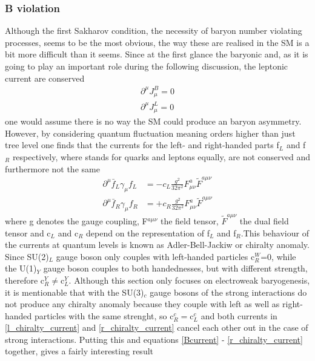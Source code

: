 \subsubsection{B violation}
Although the first Sakharov condition, the necessity of baryon number violating processes, seems to be the most obvious, the way these are realised in the SM is a bit more difficult than it seems. \newline
Since at the first glance the baryonic and, as it is going to play an important role during the following discussion, the leptonic current are  conserved
\begin{align}
	\partial^\mu J_\mu^B=0
	\label{Bcurrent}
	\\
	\partial^\mu J_\mu^L=0
	\label{Lcurrent}
\end{align}
one would assume there is no way the SM could produce an baryon asymmetry. However, by considering quantum fluctuation meaning orders higher than just tree level one finds that the currents for the left- and right-handed parts f$_L$ and f$_R$ respectively, where stands for quarks and leptons equally, are not conserved and furthermore not the same \cite{Bernreuther:2002uj}
\begin{align}
	\partial^\mu\bar{f}_L\gamma_\mu f_L&=-c_L\frac{g^2}{32\pi^2}F^a_{\mu\nu}\tilde{F}^{a\mu\nu}
	\label{l_chiralty_current}
	\\
	\partial^\mu\bar{f}_R\gamma_\mu f_R&=+c_R\frac{g^2}{32\pi^2}F^a_{\mu\nu}\tilde{F}^{a\mu\nu}
	\label{r_chiralty_current}
\end{align}
where g denotes the gauge coupling, F$^{a\mu\nu}$ the field tensor, $\tilde{F}^{a\mu\nu}$ the dual field tensor and c$_L$ and c$_R$ depend on the representation of f$_L$ and f$_R$.This behaviour of the currents at quantum levels is known as Adler-Bell-Jackiw or chiralty anomaly. 
Since SU(2)$_L$ gauge boson only couples with left-handed particles c$_R^W$=0, while the U(1)$_Y$ gauge boson couples to both handednesses, but with different strength, therefore c$_R^Y\neq$c$_L^Y$. Although this section only focuses on electroweak baryogenesis, it is mentionable that with the SU(3)$_c$ gauge bosons of the strong interactions do not produce any chiralty anomaly because they couple with left as well as right-handed particles with the same strenght, so c$_R^c=$c$_L^c$ and both currents in \eqref{l_chiralty_current} and \eqref{r_chiralty_current} cancel each other out in the case of strong interactions. \newline
Putting this and equations \ref{Bcurrent} - \ref{r_chiralty_current} together, gives a fairly interesting result
